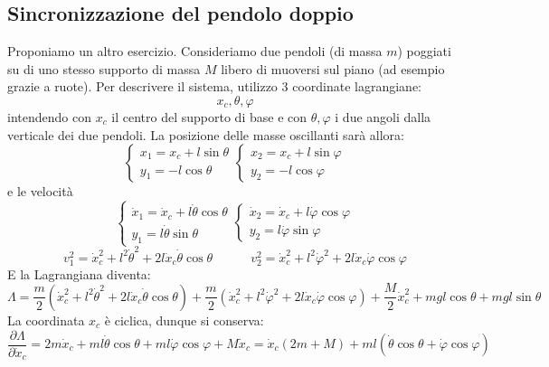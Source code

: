 \documentclass[a4paper,openany]{article}
\begin{document}
	\subsection{Sincronizzazione del pendolo doppio}
	Proponiamo un altro esercizio. Consideriamo due pendoli (di massa $m$) poggiati su di uno stesso supporto di massa $M$ libero di muoversi sul piano (ad esempio grazie a ruote). Per descrivere il sistema, utilizzo 3 coordinate lagrangiane:
	$$
	x_c,\theta,\varphi
	$$
	intendendo con $x_c$ il centro del supporto di base e con $\theta,\varphi$ i due angoli dalla verticale dei due pendoli. 
	La posizione delle masse oscillanti sarà allora:
	\begin{equation}
		\begin{cases}
			x_1 = x_c + l\sin\theta \\
			y_1 = -l\cos\theta
		\end{cases}
		\begin{cases}
			x_2 = x_c + l\sin\varphi \\
			y_2 = -l\cos\varphi
		\end{cases}
	\end{equation}
	e le velocità
	\begin{equation}
		\begin{cases}
			\dot{x}_1 = \dot{x}_c + l\dot{\theta}\cos\theta \\
			y_1 = l\dot{\theta}\sin\theta
		\end{cases}
		\begin{cases}
			\dot{x}_2 = \dot{x}_c + l\dot{\varphi}\cos\varphi \\
			y_2 = l\dot{\varphi}\sin\varphi
		\end{cases}
	\end{equation}
	\begin{equation}\label{key}
		v_1^2 = \dot{x}_c^2 + l^2\dot{\theta}^2+2l\dot{x}_c\dot{\theta}\cos\theta
		\quad \quad \quad 
		v_2^2 = \dot{x}_c^2 + l^2\dot{\varphi}^2+2l\dot{x}_c\dot{\varphi}\cos\varphi
	\end{equation}
	E la Lagrangiana diventa:
	\begin{equation}\label{key}
		\Lambda = \dfrac{m}{2}(\dot{x}_c^2 + l^2\dot{\theta}^2+2l\dot{x}_c\dot{\theta}\cos\theta)+ \dfrac{m}{2}(\dot{x}_c^2 + l^2\dot{\varphi}^2+2l\dot{x}_c\dot{\varphi}\cos\varphi) + \dfrac{M}{2}\dot{x}_c^2 + mgl\cos\theta + mgl\sin\theta
	\end{equation}
	La coordinata $x_c$ è ciclica, dunque si conserva:
	$$
	\dfrac{\partial \Lambda}{\partial \dot{x}_c} = 2m\dot{x}_c +m l\dot{\theta}\cos\theta+ ml\dot{\varphi}\cos\varphi + M\dot{x}_c = \dot{x}_c(2m+M) + ml(\dot\theta\cos\theta+\dot\varphi\cos\varphi)
	$$
\end{document}
